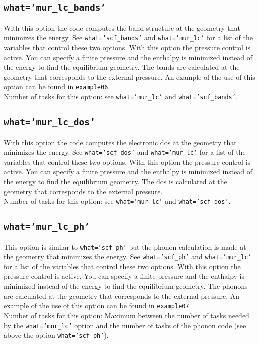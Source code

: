 \documentclass[12pt,a4paper]{article}
\begin{document}
\subsection{\color{web-blue}\texttt{what='mur\_lc\_bands'}}
With this option the code computes the band structure at the geometry 
that minimizes the energy. See  
\texttt{what='scf\_bands'} and \texttt{what='mur\_lc'} for a list of 
the variables that control these two options. 
With this option the pressure control is active. You can specify a
finite pressure and the enthalpy is minimized instead of the
energy to find the equilibrium geometry. The bands are calculated
at the geometry that corresponds to the external pressure.
An example of the use of this option can be found in \texttt{example06}. \\
Number of tasks for this option: see \texttt{what='mur\_lc'} and
\texttt{what='scf\_bands'}.

\subsection{\color{web-blue}\texttt{what='mur\_lc\_dos'}}
With this option the code computes the electronic dos at the geometry 
that minimizes the energy. See  
\texttt{what='scf\_dos'} and \texttt{what='mur\_lc'} for a list of 
the variables that control these two options. 
With this option the pressure control is active. You can specify a
finite pressure and the enthalpy is minimized instead of the
energy to find the equilibrium geometry. The dos is calculated
at the geometry that corresponds to the external pressure. \\
Number of tasks for this option: see \texttt{what='mur\_lc'} and 
\texttt{what='scf\_dos'}.

\subsection{\color{web-blue}\texttt{what='mur\_lc\_ph'}}
This option is similar to \texttt{what='scf\_ph'} but the phonon calculation
is made at the geometry that minimizes the energy.
See \texttt{what='scf\_ph'} and \texttt{what='mur\_lc'} for a
list of the variables that control these two options. 
With this option the pressure control is active. You can specify a
finite pressure and the enthalpy is minimized instead of the
energy to find the equilibrium geometry. The phonons are calculated
at the geometry that corresponds to the external pressure.
An example of the use of this option can be found in \texttt{example07}. \\
Number of tasks for this option: Maximum between the number of tasks 
needed by the \texttt{what='mur\_lc'} option and the number
of tasks of the phonon code (see above the option \texttt{what='scf\_ph'}).
\end{document}
